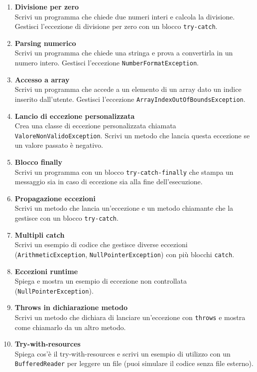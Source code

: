 \documentclass{article}
\begin{document}
\begin{enumerate}
    \item \textbf{Divisione per zero} \\
    Scrivi un programma che chiede due numeri interi e calcola la divisione. Gestisci l'eccezione di divisione per zero con un blocco \texttt{try-catch}.

    \item \textbf{Parsing numerico} \\
    Scrivi un programma che chiede una stringa e prova a convertirla in un numero intero. Gestisci l'eccezione \texttt{NumberFormatException}.

    \item \textbf{Accesso a array} \\
    Scrivi un programma che accede a un elemento di un array dato un indice inserito dall'utente. Gestisci l'eccezione \texttt{ArrayIndexOutOfBoundsException}.

    \item \textbf{Lancio di eccezione personalizzata} \\
    Crea una classe di eccezione personalizzata chiamata \texttt{ValoreNonValidoException}. Scrivi un metodo che lancia questa eccezione se un valore passato è negativo.

    \item \textbf{Blocco finally} \\
    Scrivi un programma con un blocco \texttt{try-catch-finally} che stampa un messaggio sia in caso di eccezione sia alla fine dell'esecuzione.

    \item \textbf{Propagazione eccezioni} \\
    Scrivi un metodo che lancia un'eccezione e un metodo chiamante che la gestisce con un blocco \texttt{try-catch}.

    \item \textbf{Multipli catch} \\
    Scrivi un esempio di codice che gestisce diverse eccezioni (\texttt{ArithmeticException}, \texttt{NullPointerException}) con più blocchi \texttt{catch}.

    \item \textbf{Eccezioni runtime} \\
    Spiega e mostra un esempio di eccezione non controllata (\texttt{NullPointerException}).

    \item \textbf{Throws in dichiarazione metodo} \\
    Scrivi un metodo che dichiara di lanciare un'eccezione con \texttt{throws} e mostra come chiamarlo da un altro metodo.

    \item \textbf{Try-with-resources} \\
    Spiega cos'è il try-with-resources e scrivi un esempio di utilizzo con un \texttt{BufferedReader} per leggere un file (puoi simulare il codice senza file esterno).
\end{enumerate}
\end{document}
